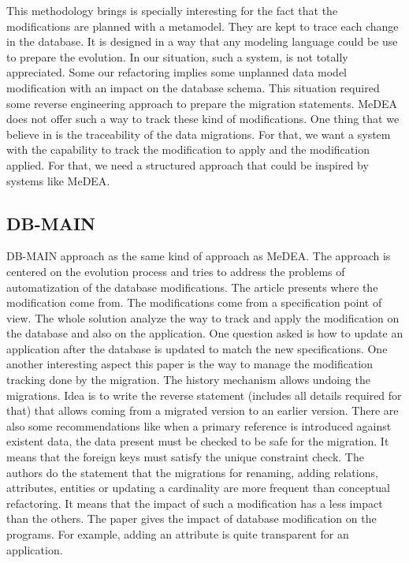 This methodology brings is specially interesting for the fact that the modifications are planned with a metamodel. They are kept to trace each change in the database. It is designed in a way that any modeling language could be use to prepare the evolution. In our situation, such a system, is not totally appreciated. Some our refactoring implies some unplanned data model modification with an impact on the database schema. This situation required some reverse engineering approach to prepare the migration statements. MeDEA does not offer such a way to track these kind of modifications. One thing that we believe in is the traceability of the data migrations. For that, we want a system with the capability to track the modification to apply and the modification applied. For that, we need a structured approach that could be inspired by systems like MeDEA.

\subsection{DB-MAIN}

DB-MAIN\cite{Hick2006534} approach as the same kind of approach as MeDEA. The approach is centered on the evolution process and tries to address the problems of automatization of the database modifications. The article presents where the modification come from. The modifications come from a specification point of view. The whole solution analyze the way to track and apply the modification on the database and also on the application. One question asked is how to update an application after the database is updated to match the new specifications. One another interesting aspect this paper is the way to manage the modification tracking done by the migration. The history mechanism allows undoing the migrations. Idea is to write the reverse statement (includes all details required for that) that allows coming from a migrated version to an earlier version. There are also some recommendations like when a primary reference is introduced against existent data, the data present must be checked to be safe for the migration. It means that the foreign keys must satisfy the unique constraint check. The authors do the statement that the migrations for renaming, adding relations, attributes, entities or updating a cardinality are more frequent than conceptual refactoring. It means that the impact of such a modification has a less impact than the others. The paper gives the impact of database modification on the programs. For example, adding an attribute is quite transparent for an application.

